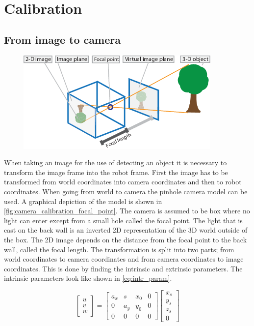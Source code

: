 \chapter{Calibration}

\section{From image to camera}
\begin{figure}[h]
\centering
\includegraphics[width=\textwidth]{figures/camera_calibration_focal_point.png}
\caption{}
\label{fig:camera_calibration_focal_point}
\end{figure}
When taking an image for the use of detecting an object it is necessary to transform the image frame into the robot frame. First the image has to be transformed from world coordinates into camera coordinates and then to robot coordinates. When going from world to camera the pinhole camera model can be used. A graphical depiction of the model is shown in \autoref{fig:camera_calibration_focal_point}. The camera is assumed to be box where no light can enter except from a small hole called the focal point. The light that is cast on the back wall is an inverted 2D representation of the 3D world outside of the box. The 2D image depends on the distance from the focal point to the back wall, called the focal length. The transformation is split into two parts; from world coordinates to camera coordinates and from camera coordinates to image coordinates. This is done by finding the intrinsic and extrinsic parameters. The intrinsic parameters look like shown in \autoref{eq:intr_param}.

\begin{equation}\label{eq:intr_param}
\begin{bmatrix}
u \\
v \\
w 
\end{bmatrix} 
 =
\begin{bmatrix}
a_x & s & x_0 & 0 \\
0 & a_y & y_0 & 0 \\
0 & 0 & 0 & 0 
\end{bmatrix}  
\begin{bmatrix}
x_s \\
y_s \\
z_s \\
0 
\end{bmatrix}
\end{equation}

